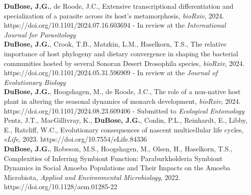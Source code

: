\documentclass{article}
\begin{document}
\hangindent=0.7cm \textbf{DuBose, J.G.}, de Roode, J.C., Extensive transcriptional differentiation and specialization of a parasite across its host's metamorphosis, \emph{bioRxiv}, 2024. https://doi.org/10.1101/2024.07.16.603694 - In review at the \emph{International Journal for Parasitology} \\

\hangindent=0.7cm \textbf{DuBose, J.G.}, Crook, T.B., Matzkin, L.M., Haselkorn, T.S., The relative importance of host phylogeny and dietary convergence in shaping the bacterial communities hosted by several Sonoran Desert Drosophila species, \emph{bioRxiv}, 2024. https://doi.org/10.1101/2024.05.31.596909 - In review at the \emph{Journal of Evolutionary Biology} \\

\hangindent=0.7cm \textbf{DuBose, J.G.}, Hoogshagen, M., de Roode, J.C., The role of a non-native host plant in altering the seasonal dynamics of monarch development, \emph{bioRxiv}, 2024. https://doi.org/10.1101/2024.08.23.609406 - Submitted to \emph{Ecological Entomology} \\

\hangindent=0.7cm Pentz, J.T., MacGillivray, K., \textbf{DuBose, J.G.}, Conlin, P.L., Reinhardt, E., Libby, E., Ratcliff, W.C., Evolutionary consequences of nascent multicellular life cycles, \emph{eLife}, 2023. https://doi.org/10.7554/eLife.84336 \\

\hangindent=0.7cm \textbf{DuBose, J.G.}, Robeson, M.S., Hoogshagen, M., Olsen, H., Haselkorn, T.S., Complexities of Inferring Symbiont Function: Paraburkholderia Symbiont Dynamics in Social Amoeba Populations and Their Impacts on the Amoeba Microbiota, \emph{Applied and Environmental Microbiology}, 2022. https://doi.org/10.1128/aem.01285-22 \\
\end{document}
